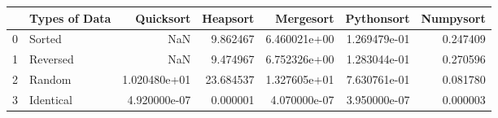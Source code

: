 \begin{tabular}{llrrrrr}
\toprule
{} & Types of Data &     Quicksort &   Heapsort &     Mergesort &    Pythonsort &  Numpysort \\
\midrule
0 &        Sorted &           NaN &   9.862467 &  6.460021e+00 &  1.269479e-01 &   0.247409 \\
1 &      Reversed &           NaN &   9.474967 &  6.752326e+00 &  1.283044e-01 &   0.270596 \\
2 &        Random &  1.020480e+01 &  23.684537 &  1.327605e+01 &  7.630761e-01 &   0.081780 \\
3 &     Identical &  4.920000e-07 &   0.000001 &  4.070000e-07 &  3.950000e-07 &   0.000003 \\
\bottomrule
\end{tabular}

